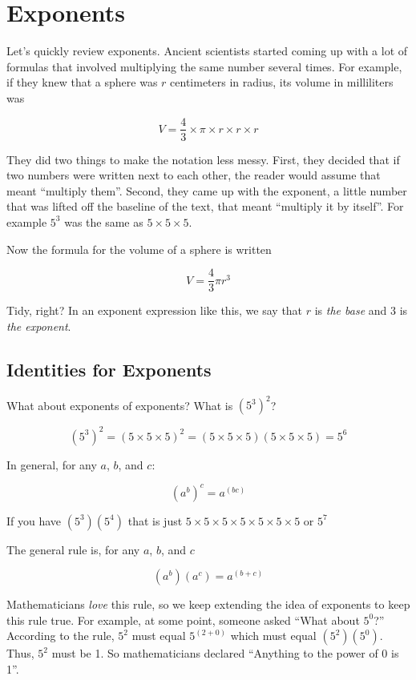 \chapter{Exponents}

Let's quickly review exponents. Ancient scientists started coming up
with a lot of formulas that involved multiplying the same number
several times. For example, if they knew that a sphere was $r$
centimeters in radius, its volume in milliliters was

$$V = \frac{4}{3} \times \pi \times r \times r \times r$$

They did two things to make the notation less messy. First, they
decided that if two numbers were written next to each other, the
reader would assume that meant ``multiply them''. Second, they came
up with the exponent, a little number that was lifted off the
baseline of the text, that meant ``multiply it by itself''. For
example $5^3$ was the same as $5 \times 5 \times 5$.

Now the formula for the volume of a sphere is written

$$V = \frac{4}{3} \pi r^3$$

Tidy, right? In an exponent expression like this, we say that $r$ is
\textit{the base} and $3$ is \textit{the exponent}.

\section{Identities for Exponents}

What about exponents of exponents?  What is $\left(5^3\right)^2$?

$$\left(5^3\right)^2 = (5 \times 5 \times 5)^2 = (5 \times 5 \times 5)(5 \times 5 \times 5) = 5^6$$

In general, for any $a$, $b$, and $c$:

$$\left(a^b\right)^c = a^{(bc)}$$

If you have $\left( 5^3 \right) \left(5^4 \right)$ that is just $5 \times 5 \times 5 \times 5 \times 5 \times 5 \times 5$ or $5^7$

The general rule is, for any $a$, $b$, and $c$

$$\left(a^b\right)\left(a^c\right) = a^{(b + c)}$$

Mathematicians \textit{love} this rule, so we keep extending the idea
of exponents to keep this rule true. For example, at some point,
someone asked ``What about $5^0$?'' According to the rule, $5^{2}$
must equal $5^{(2 + 0)}$ which must equal
$\left(5^2\right)\left(5^0\right)$.  Thus, $5^2$ must be 1. So
mathematicians declared ``Anything to the power of 0 is 1''.

